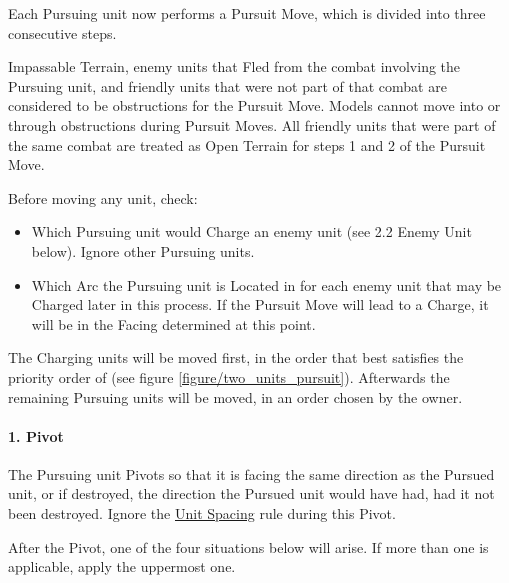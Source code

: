 Each Pursuing unit now performs a Pursuit Move, which is divided into three consecutive steps.

Impassable Terrain, enemy units that Fled from the combat involving the Pursuing unit, and friendly units that were not part of that combat are considered to be obstructions for the Pursuit Move. Models cannot move into or through obstructions during Pursuit Moves. All friendly units that were part of the same combat are treated as Open Terrain for steps 1 and 2 of the Pursuit Move.

Before moving any unit, check:
\begin{itemize}
	\item Which Pursuing unit would Charge an enemy unit (see 2.2 Enemy Unit below). Ignore other Pursuing units.
	\item Which Arc the Pursuing unit is Located in for each enemy unit that may be Charged later in this process. If the Pursuit Move will lead to a Charge, it will be in the Facing determined at this point.
\end{itemize}

\columnbreak

The Charging units will be moved first, in the order that best satisfies the priority order of  (see figure \ref{figure/two_units_pursuit}). Afterwards the remaining Pursuing units will be moved, in an order chosen by the owner.

\paragraph{1. Pivot}

The Pursuing unit Pivots so that it is facing the same direction as the Pursued unit, or if destroyed, the direction the Pursued unit would have had, had it not been destroyed. Ignore the \hyperref[unit_spacing]{Unit Spacing} rule during this Pivot.

After the Pivot, one of the four situations below will arise. If more than one is applicable, apply the uppermost one.

